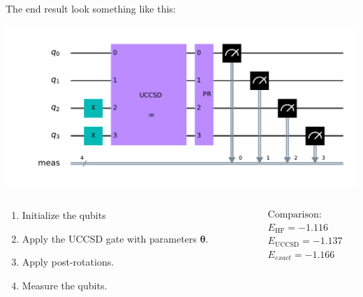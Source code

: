 \documentclass{beamer}
\renewcommand{\(}{\left(}
\renewcommand{\)}{\right)}
\renewcommand{\[}{\left[}
\renewcommand{\]}{\right]}
\begin{document}
\begin{frame}
    \frametitle{}
    The end result look something like this: 
    \begin{center}
        \includegraphics[scale=0.445, trim = 65 0 0 0 , clip]{uccsd_qc.pdf}
    \end{center}
    \begin{columns}
        \begin{column}[]{0.7\textwidth}
            \begin{enumerate}
                \item Initialize the qubits 
                \item Apply the UCCSD gate with parameters $\bm \theta$.
                \item Apply post-rotations.
                \item Measure the qubits.
            \end{enumerate}
        \end{column}
        \begin{column}[]{0.3\textwidth}
            \begin{align*}
                &\text{Comparison:}\\
                &E_{\text{HF}} = -1.116\\
                &E_{\text{UCCSD}} = -1.137 \\ 
                &E_{exact} = -1.166
            \end{align*}
        \end{column}
    \end{columns}
\end{frame}
\end{document}
